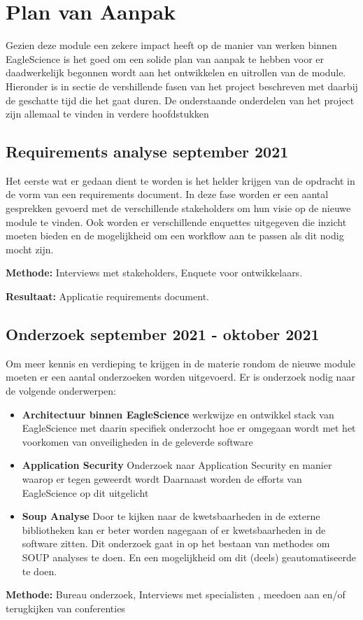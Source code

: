 
\chapter{Plan van Aanpak}\label{ch:planvanaanpak} %
Gezien deze module een zekere impact heeft op de manier van werken binnen EagleScience is het goed om een solide plan van aanpak te hebben voor er daadwerkelijk begonnen wordt aan het ontwikkelen en uitrollen van de module. Hieronder is in sectie de vershillende fasen van het project beschreven met daarbij de geschatte tijd die het gaat duren. De onderstaande onderdelen van het project zijn allemaal te vinden in verdere hoofdstukken

\section{Requirements analyse \textbf{september 2021}}\label{sec:requirements-analyse}
Het eerste wat er gedaan dient te worden is het helder krijgen van de opdracht in de vorm van een requirements document. In deze fase worden er een aantal gesprekken gevoerd met de verschillende stakeholders om hun visie op de nieuwe module te vinden. Ook worden er verschillende enquettes uitgegeven die inzicht moeten bieden en de mogelijkheid om een workflow aan te passen als dit nodig mocht zijn.

\textbf{Methode:} Interviews met stakeholders, Enquete voor ontwikkelaars.

\textbf{Resultaat:} Applicatie requirements document.

\section{Onderzoek \textbf{september 2021 - oktober 2021 }}\label{sec:onderzoek}
Om meer kennis en verdieping te krijgen in de materie rondom de nieuwe module moeten er een aantal onderzoeken worden uitgevoerd. Er is onderzoek nodig naar de volgende onderwerpen:
\begin{itemize}
    \item \textbf{Architectuur binnen EagleScience} werkwijze en ontwikkel stack van EagleScience met daarin specifiek onderzocht hoe er omgegaan wordt met het voorkomen van onveiligheden in de geleverde software
    \item \textbf{Application Security} Onderzoek naar Application Security en manier waarop er tegen geweerdt wordt Daarnaast worden de efforts van EagleScience op dit uitgelicht
    \item \textbf{Soup Analyse} Door te kijken naar de kwetsbaarheden in de externe bibliotheken kan er beter worden nagegaan of er kwetsbaarheden in de software zitten. Dit onderzoek gaat in op het bestaan van methodes om SOUP analyses te doen. En een mogelijkheid om dit (deels) geautomatiseerde te doen.
\end{itemize}
\textbf{Methode:} Bureau onderzoek, Interviews met specialisten , meedoen aan en/of terugkijken van conferenties

